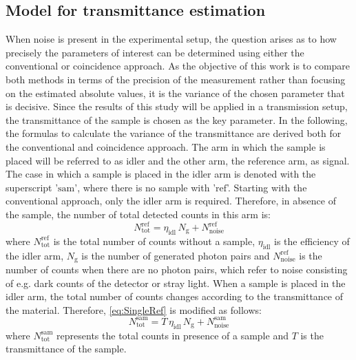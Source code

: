 \subsection{Model for transmittance estimation}
When noise is present in the experimental setup, the question arises as to how precisely the parameters of interest can be determined using either the conventional or coincidence approach. As the objective of this work is to compare both methods in terms of the precision of the measurement rather than focusing on the estimated absolute values, it is the variance of the chosen parameter that is decisive. Since the results of this study will be applied in a transmission setup, the transmittance of the sample is chosen as the key parameter. \newline
In the following, the formulas to calculate the variance of the transmittance are derived both for the conventional and coincidence approach. The arm in which the sample is placed will be referred to as idler and the other arm, the reference arm, as signal. The case in which a sample is placed in the idler arm is denoted with the superscript '$\text{sam}$', where there is no sample with '$\text{ref}$'. \newline
Starting with the conventional approach, only the idler arm is required. Therefore, in absence of the sample, the number of total detected counts in this arm is: 
\begin{equation}
	N_{\text{tot}}^{\text{ref}} = \eta_{\text{idl}} \, N_{\mathrm{g}} + N_{\text{noise}}^{\text{ref}}
	\label{eq:SingleRef}
\end{equation}
where $N_{\text{tot}}^{\text{ref}}$ is the total number of counts without a sample, $\eta_{\text{idl}}$ is the efficiency of the idler arm, $N_{\mathrm{g}}$ is the number of generated photon pairs and $N_{\text{noise}}^{\text{ref}}$ is the number of counts when there are no photon pairs, which refer to noise consisting of e.g. dark counts of the detector or stray light. \newline
When a sample is placed in the idler arm, the total number of counts changes according to the transmittance of the material. Therefore, \autoref{eq:SingleRef} is modified as follows:
\begin{equation}
	N_{\text{tot}}^{\text{sam}} = T \, \eta_{\text{idl}} \, N_{\mathrm{g}} + N_{\text{noise}}^{\text{sam}}
	\label{eq:SingleSam}
\end{equation}
where $N_{\text{tot}}^{\text{sam}}$ represents the total counts in presence of a sample and $T$ is the transmittance of the sample. \newline
